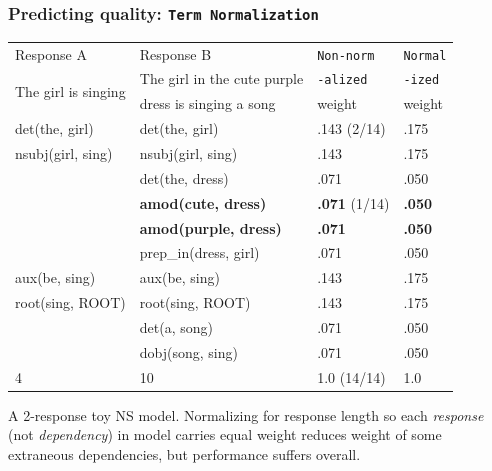 \documentclass[xcolor={dvipsnames}]{beamer}
\newcommand{\param}[1]{\texttt{#1}}
\begin{document}
\begin{frame}
\frametitle{Predicting quality: \param{Term Normalization}}

\small

\begin{table}[htb!]
\begin{center}
\begin{tabular}{|l|l|l|l|}
\hline
Response A & Response B & \param{Non-norm} & \param{Normal} \\
\cline{0-1}
\multirow{2}{*}{The girl is singing} & \footnotesize{The girl in the cute purple} & \param{-alized} & \param{-ized} \\
& dress is singing a song & weight & weight \\
\hline
\hline
det(the, girl) & det(the, girl) & 				.143 (2/14) & .175 \\
\hline
nsubj(girl, sing) & nsubj(girl, sing) & 		.143 & .175 \\
\hline
& det(the, dress) & 							.071  & .050 \\
\hline
& \textbf{amod(cute, dress)} & 				\textbf{.071} (1/14) & \textbf{.050} \\
\hline
& \textbf{amod(purple, dress)} & 			\textbf{.071} & \textbf{.050} \\
\hline
& prep\_in(dress, girl) & 						.071 & .050 \\
\hline
aux(be, sing) & aux(be, sing) & 				.143 & .175 \\
\hline
root(sing, ROOT) & root(sing, ROOT) & 			.143 & .175 \\
\hline
& det(a, song) & 								.071 & .050 \\
\hline
& dobj(song, sing) & 							.071 & .050 \\
\hline
\hline
4 & 10 & 1.0 (14/14) & 1.0 \\
\hline
\end{tabular}
\end{center}
\end{table}

A 2-response toy NS model. Normalizing for response length so each \textit{response} (not \textit{dependency}) in model carries equal weight reduces weight of some extraneous dependencies, but performance suffers overall.

\end{frame}
\end{document}
